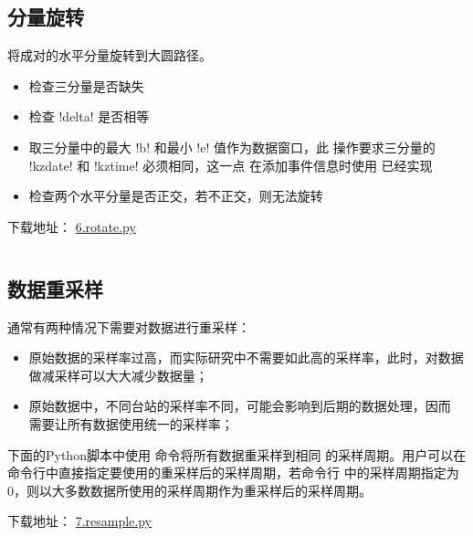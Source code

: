 \subsection{分量旋转}
\label{subsec:rotate-python}
将成对的水平分量旋转到大圆路径。
\begin{itemize}
\item 检查三分量是否缺失
\item 检查 !delta! 是否相等
\item 取三分量中的最大 !b! 和最小 !e! 值作为数据窗口，此
    操作要求三分量的 !kzdate! 和 !kztime! 必须相同，这一点
    在添加事件信息时使用  已经实现
\item 检查两个水平分量是否正交，若不正交，则无法旋转
\end{itemize}

下载地址： \href{https://raw.githubusercontent.com/seisman/SAC_Docs_zh/master/call-in-script/6.rotate.py}{6.rotate.py}
\inputminted{python}{./call-in-script/6.rotate.py}

\subsection{数据重采样}
\label{subsec:resample-python}
通常有两种情况下需要对数据进行重采样：
\begin{itemize}
\item 原始数据的采样率过高，而实际研究中不需要如此高的采样率，此时，对数据
    做减采样可以大大减少数据量；
\item 原始数据中，不同台站的采样率不同，可能会影响到后期的数据处理，因而
    需要让所有数据使用统一的采样率；
\end{itemize}
下面的Python脚本中使用  命令将所有数据重采样到相同
的采样周期。用户可以在命令行中直接指定要使用的重采样后的采样周期，若命令行
中的采样周期指定为0，则以大多数数据所使用的采样周期作为重采样后的采样周期。

下载地址： \href{https://raw.githubusercontent.com/seisman/SAC_Docs_zh/master/call-in-script/7.resample.py}{7.resample.py}
\inputminted{python}{./call-in-script/7.resample.py}
